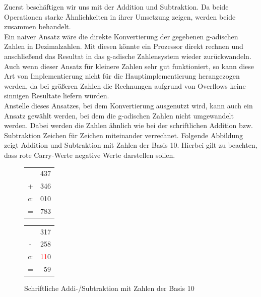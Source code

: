 \documentclass[course=erap]{aspdoc}
\begin{document}
    Zuerst beschäftigen wir uns mit der Addition und Subtraktion. Da beide Operationen
    starke Ähnlichkeiten in ihrer Umsetzung zeigen, werden beide zusammen behandelt. \\
    \newline
    Ein naiver Ansatz wäre die direkte Konvertierung der gegebenen g-adischen Zahlen
    in Dezimalzahlen. Mit diesen könnte ein Prozessor direkt rechnen und anschließend das Resultat
    in das g-adische Zahlensystem wieder zurückwandeln. Auch wenn dieser Ansatz für kleinere Zahlen sehr gut funktioniert,
    so kann diese Art von Implementierung nicht für die
    Hauptimplementierung herangezogen werden, da bei größeren Zahlen die Rechnungen aufgrund von Overflows keine
    sinnigen Resultate liefern würden.\\
    \newline
    Anstelle dieses Ansatzes, bei dem Konvertierung ausgenutzt wird, kann auch ein Ansatz gewählt werden,
    bei dem die g-adischen Zahlen nicht umgewandelt werden. Dabei werden die Zahlen ähnlich wie bei der schriftlichen
    Addition bzw. Subtraktion Zeichen für Zeichen miteinander verrechnet. Folgende Abbildung zeigt
    Addition und Subtraktion mit Zahlen der Basis 10. Hierbei gilt zu beachten, dass rote Carry-Werte
    negative Werte darstellen sollen. \\

    \begin{figure}[ht]
        \centering
        \captionsetup{justification=centering}
        \begin{center}
            \begin{tabular}{cr}
                & 437 \\
                +  & 346 \\\hline
                c: & 010  \\\hline
                =  & 783
            \end{tabular}
            \qquad \qquad \qquad
            \begin{tabular}{cr}
                & 317                  \\
                -  & 258                  \\\hline
                c: & \textcolor{red}{11}0 \\\hline
                =  & 59
            \end{tabular}
        \end{center}
        \caption{Schriftliche Addi-/Subtraktion mit Zahlen der Basis 10}
    \end{figure}
\end{document}

